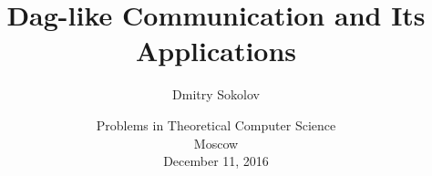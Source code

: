 

\title[Dag-like communication]{
	Dag-like Communication and Its Applications
}
  
\author[Sokolov D.]{Dmitry Sokolov}

\date{Problems in Theoretical Computer Science\\
	Moscow\\
	December 11, 2016
}



	\maketitle

	



